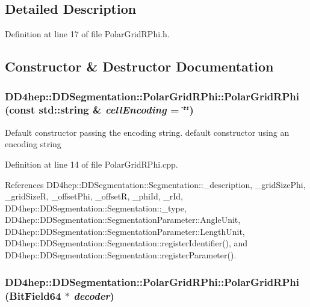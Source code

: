 \subsection{Detailed Description}


Definition at line 17 of file PolarGridRPhi.h.

\subsection{Constructor \& Destructor Documentation}
\hypertarget{class_d_d4hep_1_1_d_d_segmentation_1_1_polar_grid_r_phi_a1894c699445be28e281dc8e292c70efb}{
\subsubsection[{PolarGridRPhi}]{\setlength{\rightskip}{0pt plus 5cm}DD4hep::DDSegmentation::PolarGridRPhi::PolarGridRPhi (const std::string \& {\em cellEncoding} = {\ttfamily \char`\"{}\char`\"{}})}}
\label{class_d_d4hep_1_1_d_d_segmentation_1_1_polar_grid_r_phi_a1894c699445be28e281dc8e292c70efb}


Default constructor passing the encoding string. default constructor using an encoding string 

Definition at line 14 of file PolarGridRPhi.cpp.

References DD4hep::DDSegmentation::Segmentation::\_\-description, \_\-gridSizePhi, \_\-gridSizeR, \_\-offsetPhi, \_\-offsetR, \_\-phiId, \_\-rId, DD4hep::DDSegmentation::Segmentation::\_\-type, DD4hep::DDSegmentation::SegmentationParameter::AngleUnit, DD4hep::DDSegmentation::SegmentationParameter::LengthUnit, DD4hep::DDSegmentation::Segmentation::registerIdentifier(), and DD4hep::DDSegmentation::Segmentation::registerParameter().\hypertarget{class_d_d4hep_1_1_d_d_segmentation_1_1_polar_grid_r_phi_aca178a8d2d6a77ea6e33dddb479bbbd9}{
\subsubsection[{PolarGridRPhi}]{\setlength{\rightskip}{0pt plus 5cm}DD4hep::DDSegmentation::PolarGridRPhi::PolarGridRPhi ({\bf BitField64} $\ast$ {\em decoder})}}
\label{class_d_d4hep_1_1_d_d_segmentation_1_1_polar_grid_r_phi_aca178a8d2d6a77ea6e33dddb479bbbd9}


